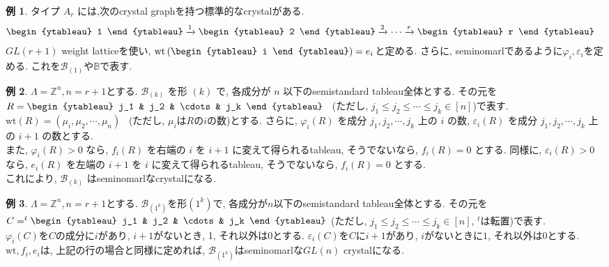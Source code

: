 \documentclass[
  a4paper, 
  12pt,
  ja=standard,
  xelatex,
  left=30truemm,
  right=30truemm,
  titlepage 
]{bxjsarticle}
\theoremstyle{definition}
\newtheorem*{ex}{例}
\begin{document}
\begin{ex}
  タイプ $A_r$ には,次のcrystal graphを持つ標準的なcrystalがある.
  \[
  \begin{aligned}
      \vcenter{\hbox{\begin{ytableau} 1 \end{ytableau}}}
      &\xrightarrow{1}
      \vcenter{\hbox{\begin{ytableau} 2 \end{ytableau}}}
      \xrightarrow{2}
      \cdots
      \xrightarrow{r}
      \vcenter{\hbox{\begin{ytableau} r \end{ytableau}}}
  \end{aligned}
  \]
  $GL(r+1)$ weight latticeを使い, $\mathrm{wt} \left( \vcenter{\hbox{\begin{ytableau} i \end{ytableau}}} \right) = e_i$と定める.
  さらに, seminomarlであるように$\varphi_i, \varepsilon_i$を定める. これを$\mathscr{B}_{(1)}$や$\mathbb{B}$で表す.
\end{ex}

\begin{ex}
  $\Lambda = \mathbb{Z}^n, n = r+1$とする.
  $\mathscr{B}_{(k)}$ を形 $(k)$ で, 各成分が $n$ 以下のsemistandard tableau全体とする. その元を$ R = \vcenter{\hbox{\begin{ytableau} j_1 & j_2 & \cdots & j_k \end{ytableau}}}$
  \ (ただし, $j_1 \leq j_2 \leq \cdots \leq j_k \in [n]$)で表す. \\
  $\mathrm{wt}(R) = (\mu_i, \mu_2, \cdots, \mu_n)$ \ (ただし, $\mu_i$は$R$の$i$の数)とする. 
  さらに, $\varphi_i(R)$ を成分 $j_1, j_2, \cdots, j_k$ 上の $i$ の数, $\varepsilon_i(R)$ を成分 $j_1, j_2, \cdots, j_k$ 上の $i+1$ の数とする. \\
  また, $\varphi_i(R) > 0$ なら, $f_i(R)$ を右端の $i$ を $i+1$ に変えて得られるtableau, そうでないなら, $f_i(R) = 0$ とする.
  同様に, $\varepsilon_i(R) > 0$ なら, $e_i(R)$ を左端の $i+1$ を $i$ に変えて得られるtableau, そうでないなら, $f_i(R) = 0$ とする.\\
  これにより, $\mathscr{B}_{(k)}$ はseminomarlなcrystalになる.
\end{ex}

\begin{ex}
  $\Lambda = \mathbb{Z}^n, n = r+1$とする.
  $\mathscr{B}_{(1^k)}$を形$(1^k)$で, 各成分が$n$以下のsemistandard tableau全体とする. その元を$ C =  ^{t} \vcenter{\hbox{\begin{ytableau} j_1 & j_2 & \cdots & j_k \end{ytableau}}}$
  (ただし, $j_1 \leq j_2 \leq \cdots \leq j_k \in [n]$, $^{t}$は転置)で表す. \\
  $\varphi_i(C)$を$C$の成分に$i$があり, $i+1$がないとき, 1, それ以外は$0$とする. $\varepsilon_i(C)$を$C$に$i+1$があり, $i$がないときに$1$, それ以外は$0$とする. \\
  $\mathrm{wt}, f_i, e_i$は, 上記の行の場合と同様に定めれば, $\mathscr{B}_{(1^k)}$はseminomarlな$GL(n)$ crystalになる.
\end{ex}
\end{document}
